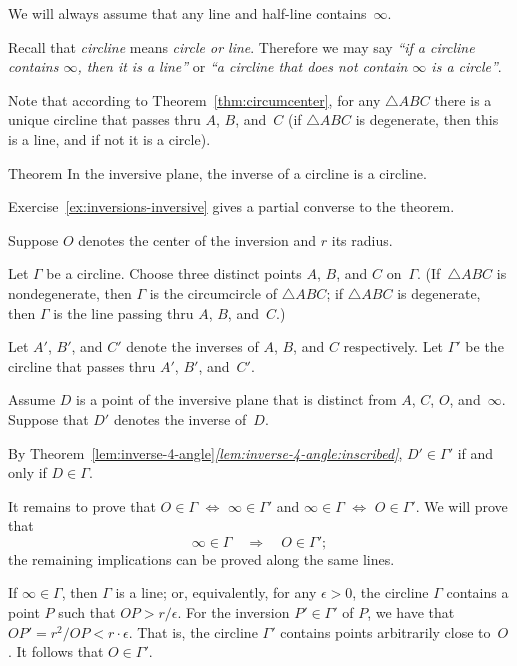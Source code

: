 We will always assume that any line and half-line contains~$\infty$. 

Recall that
\emph{circline}
means \textit{circle or line}.
Therefore we may say 
\textit{``if a circline contains $\infty$, then it is a line''} or \textit{``a circline that does not contain $\infty$  is a circle''}.

Note that according to Theorem~\ref{thm:circumcenter}, 
for any $\triangle ABC$ there is a unique circline that passes thru $A$, $B$, and~$C$
(if $\triangle ABC$ is degenerate, then this is a line, and if not it is a circle).

\begin{thm}{Theorem}\label{thm:inverse-cline}
In the inversive plane, the inverse of a circline is a circline.
\end{thm}

Exercise~\ref{ex:inversions-inversive} gives a partial converse to the theorem.

Suppose $O$ denotes the center of the inversion and $r$ its radius.

Let $\Gamma$ be a circline.
Choose three distinct points $A$, $B$, and $C$ on~$\Gamma$.
(If~$\triangle ABC$ is nondegenerate, 
then $\Gamma$ is the circumcircle of $\triangle ABC$;
if $\triangle ABC$ is degenerate, 
then $\Gamma$ is the line passing thru $A$, $B$, and~$C$.)

Let $A'$, $B'$, and $C'$ denote the inverses of $A$, $B$, and $C$ respectively.
Let $\Gamma'$ be the circline that passes thru $A'$, $B'$, and~$C'$.

Assume $D$ is a point of the inversive plane that is distinct from $A$, $C$, $O$, and~$\infty$.
Suppose that $D'$ denotes the inverse of~$D$.

By Theorem~\ref{lem:inverse-4-angle}\textit{\ref{lem:inverse-4-angle:inscribed}},
$D'\in\Gamma'$ if and only if $D\in\Gamma$.

It remains to prove that 
$O\in \Gamma$ $\Leftrightarrow$ $\infty\in\Gamma'$ 
and 
$\infty\in \Gamma$ $\Leftrightarrow$ $O\in\Gamma'$.
We will prove that
$$\infty\in \Gamma
\quad
\Longrightarrow
\quad
O\in\Gamma';$$
the remaining implications can be proved along the same lines.

If $\infty\in\Gamma$, then $\Gamma$ is a line;
or, equivalently, for any $\epsilon>0$, the circline $\Gamma$ contains a point $P$ such that $OP>r/\epsilon$.
For the inversion $P'\in\Gamma'$ of $P$, we have that $OP'=r^2/OP<r\cdot \epsilon$.
That is, the circline $\Gamma'$ contains points arbitrarily close to~$O$.
It follows that $O\in \Gamma'$.
\qeds

